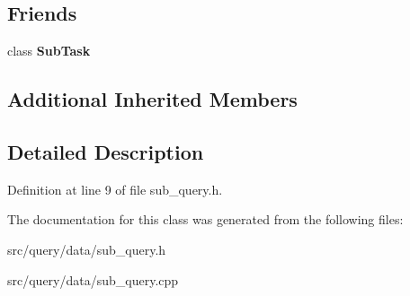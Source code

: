 \subsection*{Friends}
\begin{DoxyCompactItemize}
\item 
\mbox{\label{class_sub_query_a288acc5f848042d157069762b94173a7}} 
class {\bfseries Sub\+Task}
\end{DoxyCompactItemize}
\subsection*{Additional Inherited Members}


\subsection{Detailed Description}


Definition at line 9 of file sub\+\_\+query.\+h.



The documentation for this class was generated from the following files\+:\begin{DoxyCompactItemize}
\item 
src/query/data/sub\+\_\+query.\+h\item 
src/query/data/sub\+\_\+query.\+cpp\end{DoxyCompactItemize}
